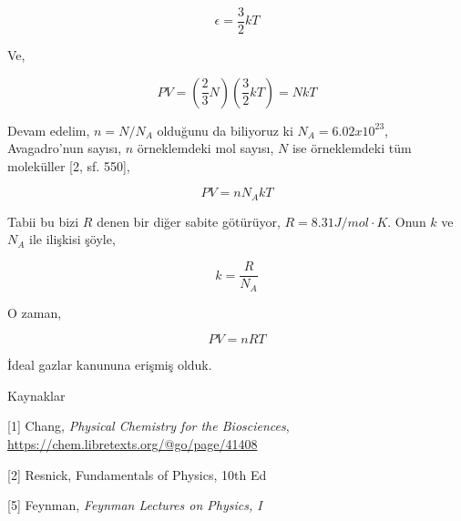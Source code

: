 \documentclass[12pt,fleqn]{article}\usepackage{../../common}
\begin{document}
$$
\epsilon = \frac{3}{2} k T
$$

Ve,

$$
PV = \left( \frac{2}{3} N \right) \left( \frac{3}{2} k T \right) = N k T
$$

Devam edelim, $n = N / N_A$ olduğunu da biliyoruz ki $N_A = 6.02 x 10^{23}$,
Avagadro'nun sayısı, $n$ örneklemdeki mol sayısı, $N$ ise örneklemdeki tüm
moleküller [2, sf. 550],

$$
PV = n N_A k T
$$

Tabii bu bizi $R$ denen bir diğer sabite götürüyor, $R = 8.31 J/mol \cdot
K$. Onun $k$ ve $N_A$ ile ilişkisi şöyle,

$$
k = \frac{R}{N_A}
$$

O zaman,

$$
PV = n R T
$$

İdeal gazlar kanununa erişmiş olduk.




Kaynaklar

[1] Chang, {\em Physical Chemistry for the Biosciences},
    \url{https://chem.libretexts.org/@go/page/41408}

[2] Resnick, Fundamentals of Physics, 10th Ed

[5] Feynman, {\em Feynman Lectures on Physics, I}
\end{document}
